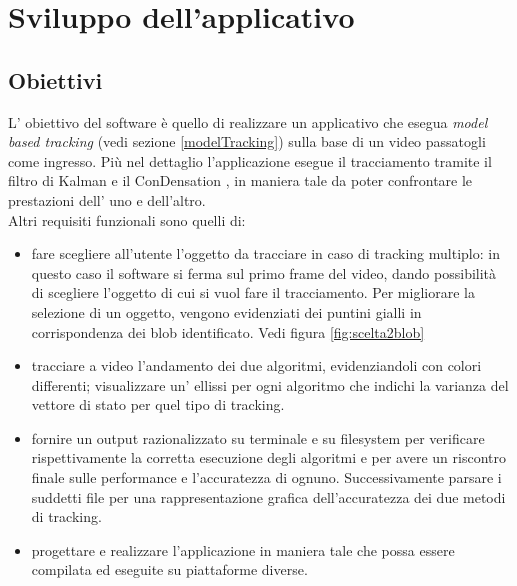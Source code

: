 
\section{Sviluppo dell'applicativo}\label{sec:software}

\subsection{Obiettivi}
L' obiettivo del software è quello di realizzare un applicativo che esegua \textit{model based tracking} (vedi sezione \ref{modelTracking}) sulla base di un video passatogli come ingresso. Più nel dettaglio l'applicazione esegue il tracciamento tramite il filtro di Kalman \cite{kalman-intro} e il ConDensation \cite{kalman-condense}, in maniera tale da poter confrontare le prestazioni dell' uno e dell'altro.\\
Altri requisiti funzionali sono quelli di:

\begin{itemize}
 \item  fare scegliere all'utente l'oggetto da tracciare in caso di tracking multiplo: in questo caso il software si ferma sul primo frame del video, dando possibilità di scegliere l'oggetto di cui si vuol fare il tracciamento. Per migliorare la selezione di un oggetto, vengono evidenziati dei puntini gialli in corrispondenza dei blob identificato. Vedi figura \ref{fig:scelta2blob}

\item tracciare a video l'andamento dei due algoritmi, evidenziandoli con colori differenti; visualizzare un' ellissi per ogni algoritmo che indichi la varianza del vettore di stato per quel tipo di tracking.

\item fornire un output razionalizzato su terminale e su filesystem per verificare rispettivamente la corretta esecuzione degli algoritmi e per avere un riscontro finale sulle performance e l'accuratezza di ognuno. Successivamente parsare i suddetti file per una rappresentazione grafica dell'accuratezza dei due metodi di tracking.

\item progettare e realizzare l'applicazione in maniera tale che possa essere compilata ed eseguite su piattaforme diverse.


\end{itemize}

